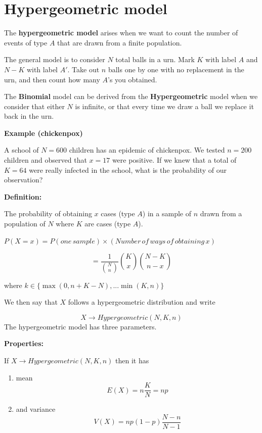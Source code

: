 \documentclass[
]{book}
\begin{document}
\hypertarget{hypergeometric-model}{%
\section{Hypergeometric model}\label{hypergeometric-model}}

The \textbf{hypergeometric model} arises when we want to count the number of events of type \(A\) that are drawn from a finite population.

The general model is to consider \(N\) total balls in a urn. Mark \(K\) with label \(A\) and \(N-K\) with label \(A'\). Take out \(n\) balls one by one with no replacement in the urn, and then count how many \(A\)'s you obtained.

The \textbf{Binomial} model can be derived from the \textbf{Hypergeometric} model when we consider that either \(N\) is infinite, or that every time we draw a ball we replace it back in the urn.

\textbf{Example (chickenpox)}

A school of \(N=600\) children has an epidemic of chickenpox. We tested \(n=200\) children and observed that \(x=17\) were positive. If we knew that a total of \(K=64\) were really infected in the school, what is the probability of our observation?

\textbf{Definition:}

The probability of obtaining \(x\) cases (type \(A\)) in a sample of \(n\) drawn from a population of \(N\) where \(K\) are cases (type \(A\)).

\(P(X=x)=P(one\,sample) \times (Number\, of\, ways\, of\, obtaining\, x)\)

\[=\frac{1}{\binom N n}\binom K x \binom {N-K} {n-x}\]

where \(k \in \{\max(0, n+K-N), ... \min(K, n) \}\)

We then say that \(X\) follows a hypergeometric distribution and write

\[X \rightarrow Hypergeometric(N,K,n)\]
The hypergeometric model has three parameters.

\textbf{Properties:}

If \(X \rightarrow Hypergeometric(N,K,n)\) then it has

\begin{enumerate}
\def\labelenumi{\arabic{enumi})}
\item
  mean \[E(X) =  n  \frac{K}{N} = np\]
\item
  and variance \[V(X) = np(1-p)\frac{N-n}{N-1}\]
\end{enumerate}
\end{document}
